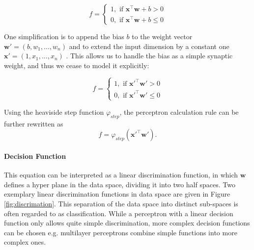 \[
	f = 
		\begin{cases}
			1, \text{  if  } \textbf{x}^\intercal \textbf{w} + b > 0  \\
			0, \text{  if  } \textbf{x}^\intercal \textbf{w} + b \le 0
		\end{cases}	
\]

One simplification is to append the bias $b$ to the weight vector $\textbf{w}' = (b , w_1, ... , w_n)$ and to extend the input dimension by a constant one $\textbf{x}' = (1, x_1 , ... , x_n)$ .
This allows us to handle the bias as a simple synaptic weight, and thus we cease to model it explicitly:

\[
	f = 
		\begin{cases}
			1, \text{  if  } \textbf{x}'^\intercal \textbf{w}'> 0  \\
			0, \text{  if  } \textbf{x}'^\intercal \textbf{w}' \le 0
		\end{cases}	
\]



Using the heaviside step function $\varphi_{step}$, the perceptron calculation rule can be further rewritten as 
\[
	f = \varphi_{step}(\textbf{x}'^\intercal \textbf{w}') .
\]   

\paragraph{Decision Function} \label{c:perdecision}

This equation can be interpreted as a linear discrimination function, in which $\textbf{w}$ defines a hyper plane in the data space, dividing it into two half spaces. 
Two exemplary linear discrimination functions in data space are given in Figure \ref{fig:discrimation}.
This separation of the data space into distinct sub-spaces is often regarded to as classification. 
While a perceptron with a linear decision function only allows quite simple discrimination, more complex decision functions can be chosen e.g. multilayer perceptrons combine simple functions into more complex ones. 


